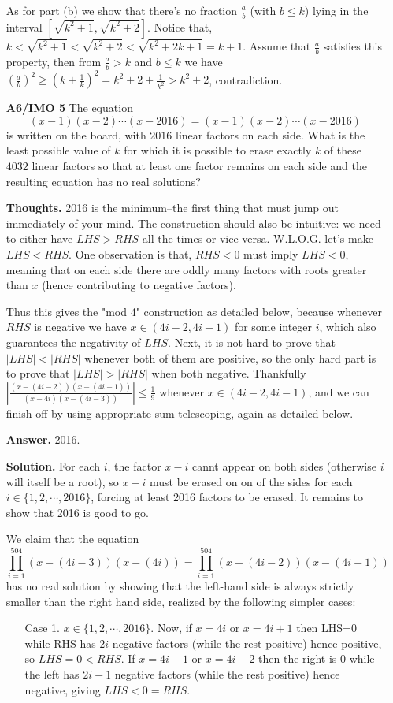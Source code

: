\documentclass[11pt,a4paper]{article}
\begin{document}
\begin{itemize}
As for part (b) we show that there's no fraction $\frac ab$ (with $b\le k$) lying in the interval $[\sqrt{k^2+1}, \sqrt{k^2+2}]$. 
Notice that, $k< \sqrt{k^2+1} < \sqrt{k^2+2} < \sqrt{k^2+2k+1} =k+1$. 
Assume that $\frac ab$ satisfies this property, 
then from $\frac ab > k$ and $b\le k$ we have 
$(\frac ab)^2\ge (k+\frac 1k)^2=k^2+2+\frac 1{k^2} > k^2+2$, contradiction. 

\item[\textbf{A6/IMO 5}]
The equation
$$(x-1)(x-2)\cdots(x-2016)=(x-1)(x-2)\cdots (x-2016)$$is written on the board, with $2016$ linear factors on each side. What is the least possible value of $k$ for which it is possible to erase exactly $k$ of these $4032$ linear factors so that at least one factor remains on each side and the resulting equation has no real solutions?

\textbf{Thoughts.} 2016 is the minimum--the first thing that must jump out immediately of your mind. 
The construction should also be intuitive: we need to either have $LHS>RHS$ all the times or vice versa. 
W.L.O.G. let's make $LHS<RHS$. One observation is that, $RHS<0$ must imply $LHS<0$, meaning that on each side there are oddly many factors with roots greater than $x$ (hence contributing to negative factors). 

Thus this gives the "mod 4" construction as detailed below, because whenever $RHS$ is negative we have $x\in (4i-2, 4i-1)$ for some integer $i$, which also guarantees the negativity of $LHS$. 
Next, it is not hard to prove that $|LHS|<|RHS|$ whenever both of them are positive, 
so the only hard part is to prove that $|LHS|>|RHS|$ when both negative. 
Thankfully $|\frac{(x-(4i-2))(x-(4i-1))}{(x-4i)(x-(4i-3))}|\le \frac 19$ whenever $x\in (4i-2, 4i-1)$, and we can finish off by using appropriate sum telescoping, again as detailed below. 

\textbf{Answer.} 2016.

\textbf{Solution.}  
For each $i$, the factor $x-i$ cannt appear on both sides (otherwise $i$ will itself be a root), 
so $x-i$ must be erased on on of the sides for each $i\in \{1, 2, \cdots , 2016\}$, forcing at least 2016 factors to be erased. 
It remains to show that 2016 is good to go. 

We claim that the equation 
$$\displaystyle\prod_{i=1}^{504} (x-(4i-3))(x-(4i))=\displaystyle\prod_{i=1}^{504} (x-(4i-2))(x-(4i-1))$$ 
has no real solution by showing that the left-hand side is always strictly smaller than the right hand side, realized by the following simpler cases: 
\begin{itemize}
\item [Case 1.] 
$x\in\{1,2,\cdots ,2016\}$. 
Now, if $x=4i$ or $x=4i+1$ then LHS=0 while RHS has $2i$ negative factors (while the rest positive) hence positive, 
so $LHS=0<RHS$. 
If $x=4i-1$ or $x=4i-2$ then the right is 0 while the left has $2i-1$ negative factors (while the rest positive) hence negative, 
giving $LHS<0=RHS$. 


\end{itemize}
\end{itemize}
\end{document}
